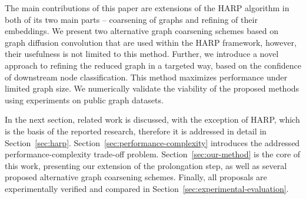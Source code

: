 The main contributions of this paper are extensions of the HARP algorithm in both of its two main parts -- coarsening of graphs and refining of their embeddings. We present two alternative graph coarsening schemes based on graph diffusion convolution that are used within the HARP framework, however, their usefulness is not limited to this method. Further, we introduce a novel approach to refining the reduced graph in a targeted way, based on the confidence of downstream node classification. This method maximizes performance under limited graph size. We numerically validate the viability of the proposed methods using experiments on public graph datasets.

In the next section, related work is discussed, with the exception of HARP, which is the basis of the reported research, therefore it is addressed in detail in Section~\ref{sec:harp}. Section~\ref{sec:performance-complexity} introduces the addressed performance-complexity trade-off problem. Section~\ref{sec:our-method} is the core of this work, presenting our extension of the prolongation step, as well as several proposed alternative graph coarsening schemes. Finally, all proposals are experimentally verified and compared in Section~\ref{sec:experimental-evaluation}.

